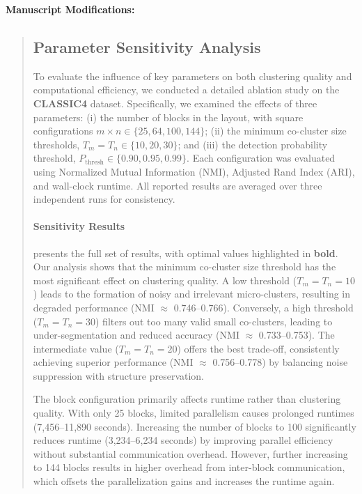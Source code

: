 \documentclass{ar2rc}
\begin{document}
\textbf{Manuscript Modifications:}
\begin{quote}
  \subsection*{ Parameter Sensitivity Analysis}

  To evaluate the influence of key parameters on both clustering quality and computational efficiency, we conducted a detailed ablation study on the \textbf{CLASSIC4} dataset. Specifically, we examined the effects of three parameters: (i) the number of blocks in the layout, with square configurations $m \times n \in \{25, 64, 100, 144\}$; (ii) the minimum co-cluster size thresholds, $T_m = T_n \in \{10, 20, 30\}$; and (iii) the detection probability threshold, $P_{\text{thresh}} \in \{0.90, 0.95, 0.99\}$. Each configuration was evaluated using Normalized Mutual Information (NMI), Adjusted Rand Index (ARI), and wall-clock runtime. All reported results are averaged over three independent runs for consistency.

  \paragraph{Sensitivity Results}
   presents the full set of results, with optimal values highlighted in \textbf{bold}. Our analysis shows that the minimum co-cluster size threshold has the most significant effect on clustering quality. A low threshold ($T_m = T_n = 10$) leads to the formation of noisy and irrelevant micro-clusters, resulting in degraded performance (NMI $\approx$ 0.746--0.766). Conversely, a high threshold ($T_m = T_n = 30$) filters out too many valid small co-clusters, leading to under-segmentation and reduced accuracy (NMI $\approx$ 0.733--0.753). The intermediate value ($T_m = T_n = 20$) offers the best trade-off, consistently achieving superior performance (NMI $\approx$ 0.756--0.778) by balancing noise suppression with structure preservation.

  The block configuration primarily affects runtime rather than clustering quality. With only 25 blocks, limited parallelism causes prolonged runtimes (7,456--11,890 seconds). Increasing the number of blocks to 100 significantly reduces runtime (3,234--6,234 seconds) by improving parallel efficiency without substantial communication overhead. However, further increasing to 144 blocks results in higher overhead from inter-block communication, which offsets the parallelization gains and increases the runtime again.


\end{quote}
\end{document}
